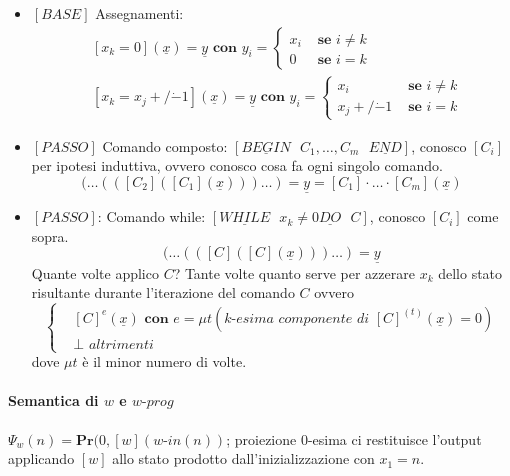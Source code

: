 \documentclass{article}
\begin{document}
\begin{itemize}
\item $[BASE]$ Assegnamenti:
\begin{displaymath}
	\begin{split}
		&[x_k=0](\underline{x}) = \underline{y} \textbf{ con } y_i=\begin{cases}
				x_i &\textbf{ se } i \neq k \\
				0 &\textbf{ se } i = k
			\end{cases} \\		
		&[x_k=x_j +/\dot{-}1](\underline{x}) = \underline{y} \textbf{ con } y_i=\begin{cases}
				x_i &\textbf{ se } i \neq k \\
				x_j +/\dot{-}1 &\textbf{ se } i = k
			\end{cases} 
	\end{split}
\end{displaymath}
\item $[PASSO]$ Comando composto: $[\underline{\textit{BEGIN}}\textit{ }C_1, \dots, C_m \textit{ } \underline{\textit{END}}]$, conosco $[C_i]$ per ipotesi induttiva, ovvero conosco cosa fa ogni singolo comando.
\begin{displaymath}
	[C_m](\dots(([C_2]([C_1](\underline{x})))\dots) = \underline{y} = [C_1] \cdot \dots \cdot [C_m](\underline{x})
\end{displaymath}
\item $[PASSO]$: Comando while: $[\underline{\textit{WHILE}}\textit{ }x_k \neq 0 \underline{\textit{DO}}\textit{ } C]$, conosco $[C_i]$ come sopra.
\begin{displaymath}
	[C](\dots(([C]([C](\underline{x})))\dots) = \underline{y}
\end{displaymath}
Quante volte applico $C$? Tante volte quanto serve per azzerare $x_k$ dello stato risultante durante l'iterazione del comando $C$ ovvero
\begin{displaymath}
	\begin{cases}
		&[C]^e(\underline{x}) \textbf{ con } e=\mu t(\textit{$k$-esima componente di }[C]^{(t)}(\underline{x})=0 )\\
		&\perp \textit{ altrimenti}
	\end{cases}
\end{displaymath}
dove $\mu t$ è il minor numero di volte.
\end{itemize}

\paragraph{Semantica di $w$ e $w\textit{-prog}$}
$\Psi_w(n)=\textbf{Pr}(0, [w](w\textit{-in}(n))$; proiezione 0-esima ci restituisce l'output applicando $[w]$ allo stato prodotto dall'inizializzazione con $x_1=n$.
\end{document}
